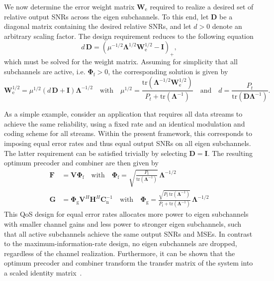 We now determine the error weight matrix $\mathbf{W}_{\mathrm{e}}$ required to realize a desired set of relative output \acp{SNR} across the eigen subchannels.
To this end, let $\mathbf{D}$ be a diagonal matrix containing the desired relative \acp{SNR}, and let $d > 0$ denote an arbitrary scaling factor.
The design requirement reduces to the following equation
\begin{equation}
\label{eq:QoS_weight_matrix_equation}
    d \, \mathbf{D} = (\mu^{-1/2} \mathbf{\Lambda}^{1/2} \mathbf{W}^{1/2}_{\mathrm{e}} - \mathbf{I})_{+},
\end{equation}
which must be solved for the weight matrix.
Assuming for simplicity that all subchannels are active, i.e. $\mathbf{\Phi}_{\mathrm{f}} > 0$, the corresponding solution is given by~\cite{su_mimo_joint_precoder_decoder_design}
\begin{equation}
\label{eq:QoS_weight_matrix_solution}
    \mathbf{W}^{1/2}_{\mathrm{e}} = \mu^{1/2} (d \, \mathbf{D} + \mathbf{I}) \mathbf{\Lambda}^{-1/2}
    \quad \text{with} \quad \mu^{1/2} = \frac{\mathrm{tr}(\mathbf{\Lambda}^{-1/2} \mathbf{W}^{1/2}_{\mathrm{e}})}{P_t + \mathrm{tr}(\mathbf{\Lambda}^{-1})}
    \quad \text{and} \quad d = \frac{P_t}{\mathrm{tr}(\mathbf{D} \mathbf{\Lambda}^{-1})}.
\end{equation}

As a simple example, consider an application that requires all data streams to achieve the same reliability, using a fixed rate and an identical modulation and coding scheme for all streams.
Within the present framework, this corresponds to imposing equal error rates and thus equal output \acp{SNR} on all eigen subchannels.
The latter requirement can be satisfied trivially by selecting $\mathbf{D} = \mathbf{I}$.
The resulting optimum precoder and combiner are then given by~\cite{su_mimo_joint_precoder_decoder_design}
\begin{subequations}
\label{eq:optimum_precoder_combiner_equal_errors}
\begin{align}
    \mathbf{F} &= \mathbf{V} \mathbf{\Phi}_{\mathrm{f}} 
    \quad \text{with} \quad \mathbf{\Phi}_{\mathrm{f}} = \sqrt{\frac{P_t}{\mathrm{tr}(\mathbf{\Lambda}^{-1})}} \, \mathbf{\Lambda}^{-1/2}  \\
    \mathbf{G} &= \mathbf{\Phi}_{\mathrm{g}} \mathbf{V}^H \mathbf{H}^H \mathbf{C}^{-1}_{\mathrm{n}} 
    \quad \text{with} \quad \mathbf{\Phi}_{\mathrm{g}} = \frac{\sqrt{P_t \, \mathrm{tr}(\mathbf{\Lambda}^{-1})}}{P_t + \mathrm{tr}(\mathbf{\Lambda}^{-1})} \, \mathbf{\Lambda}^{-1/2} 
\end{align}
\end{subequations}
This \ac{QoS} design for equal error rates allocates more power to eigen subchannels with smaller channel gains and less power to stronger eigen subchannels, such that all active subchannels achieve the same output \acp{SNR} and \acp{MSE}.
In contrast to the maximum-information-rate design, no eigen subchannels are dropped, regardless of the channel realization.
Furthermore, it can be shown that the optimum precoder and combiner transform the transfer matrix of the system into a scaled identity matrix~\cite{su_mimo_joint_precoder_decoder_design}.

